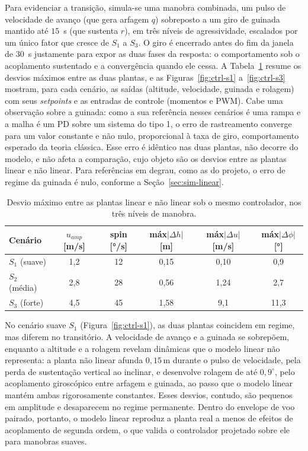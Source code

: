 Para evidenciar a transição, simula-se uma manobra combinada, um pulso de velocidade de avanço (que gera arfagem $q$) sobreposto a um giro {\color{blue}de guinada mantido até $15$~s} (que sustenta $r$), em três níveis de agressividade, escalados por um único fator que cresce de $S_1$ a $S_3$. {\color{blue}O giro é encerrado antes do fim da janela de $30$~s justamente para expor as duas fases da resposta: o comportamento sob o acoplamento sustentado e a convergência quando ele cessa.} A Tabela~\ref{tab:ctrl-cmp} resume os desvios máximos entre as duas plantas, e as Figuras~\ref{fig:ctrl-s1} a~\ref{fig:ctrl-s3} mostram, para cada cenário, as saídas (altitude, velocidade, guinada e rolagem) com seus \emph{setpoints} e as entradas de controle (momentos e PWM). Cabe uma observação sobre a guinada: como a sua referência nesses cenários é uma rampa e a malha é um PD sobre um sistema do tipo 1, o erro de rastreamento converge para um valor constante e não nulo, proporcional à taxa de giro, comportamento esperado da teoria clássica. Esse erro é idêntico nas duas plantas, não decorre do modelo, e não afeta a comparação, cujo objeto são os desvios entre as plantas linear e não linear. Para referências em degrau, como as do projeto, o erro de regime da guinada é nulo, conforme a Seção~\ref{sec:sim-linear}.

\begin{table}[ht]
\centering
\caption{Desvio máximo entre as plantas linear e não linear sob o mesmo controlador, nos três níveis de manobra.}
\label{tab:ctrl-cmp}
\begin{tabular}{l c c c c c}
\toprule
Cenário & $u_{amp}$ [m/s] & spin [°/s] & máx$|\Delta h|$ [m] & máx$|\Delta u|$ [m/s] & máx$|\Delta\phi|$ [°] \\
\midrule
$S_1$ (suave) & 1,2 & 12 & 0,15 & 0,10 & 0,9  \\
$S_2$ (média) & 2,8 & 28 & 0,56 & {\color{blue}1,24} & {\color{blue}2,7}  \\
$S_3$ (forte) & 4,5 & 45 & {\color{blue}1,58} & {\color{blue}9,1} & {\color{blue}11,3} \\
\bottomrule
\end{tabular}
\end{table}

No cenário suave $S_1$ (Figura~\ref{fig:ctrl-s1}), as duas plantas coincidem em regime, mas diferem no transitório. A velocidade de avanço e a guinada se sobrepõem, enquanto a altitude e a rolagem revelam dinâmicas que o modelo linear não representa: a planta não linear afunda $0{,}15$\,m durante o pulso de velocidade, pela perda de sustentação vertical ao inclinar, e desenvolve rolagem de até $0{,}9^\circ$, pelo acoplamento giroscópico entre arfagem e guinada, ao passo que o modelo linear mantém ambas rigorosamente constantes. Esses desvios, contudo, são pequenos em amplitude e desaparecem no regime permanente. Dentro do envelope de voo pairado, portanto, o modelo linear reproduz a planta real a menos de efeitos de acoplamento de segunda ordem, o que valida o controlador projetado sobre ele para manobras suaves.

